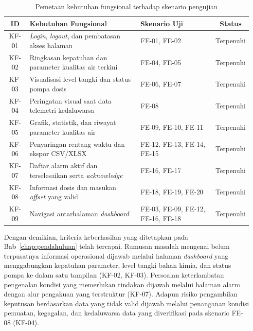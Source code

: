 \begin{table}[H]
\centering
\caption{Pemetaan kebutuhan fungsional terhadap skenario pengujian}
\label{tab:pemetaan-kf}
\begin{tabular}{|c|p{7cm}|p{3cm}|c|}
\hline
\textbf{ID} & \textbf{Kebutuhan Fungsional} & \textbf{Skenario Uji} & \textbf{Status} \\ \hline
KF-01 & \textit{Login}, \textit{logout}, dan pembatasan akses halaman & FE-01, FE-02 & Terpenuhi \\ \hline
KF-02 & Ringkasan kepatuhan dan parameter kualitas air terkini & FE-04, FE-05 & Terpenuhi \\ \hline
KF-03 & Visualisasi level tangki dan status pompa dosis & FE-06, FE-07 & Terpenuhi \\ \hline
KF-04 & Peringatan visual saat data telemetri kedaluwarsa & FE-08 & Terpenuhi \\ \hline
KF-05 & Grafik, statistik, dan riwayat parameter kualitas air & FE-09, FE-10, FE-11 & Terpenuhi \\ \hline
KF-06 & Penyaringan rentang waktu dan ekspor CSV/XLSX & FE-12, FE-13, FE-14, FE-15 & Terpenuhi \\ \hline
KF-07 & Daftar alarm aktif dan terselesaikan serta \textit{acknowledge} & FE-16, FE-17 & Terpenuhi \\ \hline
KF-08 & Informasi dosis dan masukan \textit{offset} yang valid & FE-18, FE-19, FE-20 & Terpenuhi \\ \hline
KF-09 & Navigasi antarhalaman \textit{dashboard} & FE-03, FE-09, FE-12, FE-16, FE-18 & Terpenuhi \\ \hline
\end{tabular}
\end{table}

Dengan demikian, kriteria keberhasilan yang ditetapkan pada Bab~\ref{chap:pendahuluan} telah tercapai. Rumusan masalah 
mengenai belum terpusatnya informasi operasional dijawab melalui halaman \textit{dashboard} yang menggabungkan kepatuhan 
parameter, level tangki bahan kimia, dan status pompa ke dalam satu tampilan (KF-02, KF-03). Persoalan keterlambatan 
pengenalan kondisi yang memerlukan tindakan dijawab melalui halaman alarm dengan alur pengakuan yang terstruktur (KF-07). 
Adapun risiko pengambilan keputusan berdasarkan data yang tidak valid dijawab melalui penanganan kondisi pemuatan, 
kegagalan, dan kedaluwarsa data yang diverifikasi pada skenario FE-08 (KF-04).

